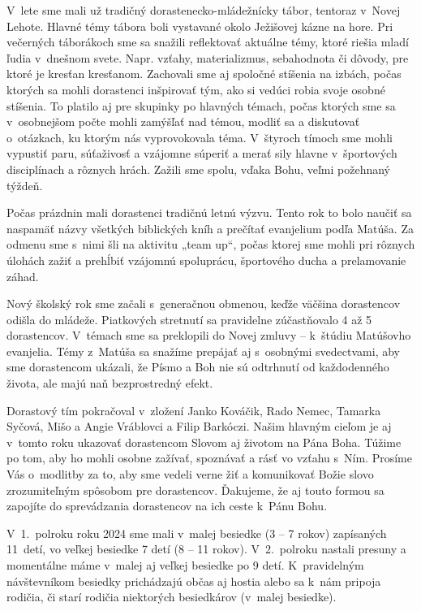 V~lete sme mali už tradičný dorastenecko-mládežnícky tábor, tentoraz v~Novej Lehote. Hlavné témy tábora boli vystavané okolo Ježišovej kázne na hore. Pri večerných táborákoch sme sa snažili reflektovať aktuálne témy, ktoré riešia mladí ľudia v~dnešnom svete. Napr. vzťahy, materializmus, sebahodnota či dôvody, pre ktoré je kresťan kresťanom. Zachovali sme aj spoločné stíšenia na izbách, počas ktorých sa mohli dorastenci inšpirovať tým, ako si vedúci robia svoje osobné stíšenia. To platilo aj pre skupinky po hlavných témach, počas ktorých sme sa v~osobnejšom počte mohli zamýšľať nad témou, modliť sa a diskutovať o~otázkach, ku ktorým nás vyprovokovala téma. V~štyroch tímoch sme mohli vypustiť paru, súťaživosť a vzájomne súperiť a merať sily hlavne v~športových disciplínach a rôznych hrách. Zažili sme spolu, vďaka Bohu, veľmi požehnaný týždeň.

Počas prázdnin mali dorastenci tradičnú letnú výzvu. Tento rok to bolo naučiť sa naspamäť názvy všetkých biblických kníh a prečítať evanjelium podľa Matúša. Za odmenu sme s~nimi šli na aktivitu „team up“, počas ktorej sme mohli pri rôznych úlohách zažiť a prehĺbiť vzájomnú spoluprácu, športového ducha a prelamovanie záhad.

Nový školský rok sme začali s~generačnou obmenou, keďže väčšina dorastencov odišla do mládeže. Piatkových stretnutí sa pravidelne zúčastňovalo 4 až 5 dorastencov. V~témach sme sa preklopili do Novej zmluvy -- k~štúdiu Matúšovho evanjelia. Témy z~Matúša sa snažíme prepájať aj s~osobnými svedectvami, aby sme dorastencom ukázali, že Písmo a Boh nie sú odtrhnutí od každodenného života, ale majú naň bezprostredný efekt.

Dorastový tím pokračoval v~zložení Janko Kováčik, Rado Nemec, Tamarka Syčová, Mišo a Angie Vráblovci a Filip Barkóczi. Našim hlavným cieľom je aj v~tomto roku ukazovať dorastencom Slovom aj životom na Pána Boha. Túžime po tom, aby ho mohli osobne zažívať, spoznávať a rásť vo vzťahu s~Ním. Prosíme Vás o~modlitby za to, aby sme vedeli verne žiť a komunikovať Božie slovo zrozumiteľným spôsobom pre dorastencov. Ďakujeme, že aj touto formou sa zapojíte do sprevádzania dorastencov na ich ceste k~Pánu Bohu.




V~1.~polroku roku 2024 sme mali v~malej besiedke (3 -- 7 rokov) zapísaných 11~detí, vo veľkej besiedke 7 detí (8 -- 11 rokov). V~2.~polroku nastali presuny a momentálne máme v~malej aj veľkej besiedke po 9 detí. K~pravidelným návštevníkom besiedky prichádzajú občas aj hostia alebo sa k~nám pripoja rodičia, či starí rodičia niektorých besiedkárov (v~malej besiedke).

